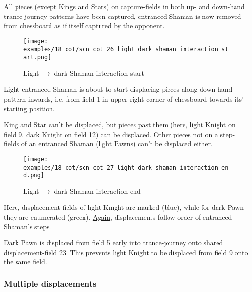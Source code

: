 All pieces (except Kings and Stars) on capture-fields in both up- and down-hand trance-journey
patterns have been captured, entranced Shaman is now removed from chessboard as if itself
captured by the opponent.

\clearpage %

\noindent
\begin{figure}[!h]
\texttt{[image: examples/18\_cot/scn\_cot\_26\_light\_dark\_shaman\_interaction\_start.png]}
\caption{Light $\rightarrow$ dark Shaman interaction start}
\label{fig:scn_cot_26_light_dark_shaman_interaction_start}
\end{figure}

Light-entranced Shaman is about to start displacing pieces along down-hand pattern inwards,
i.e. from field 1 in upper right corner of chessboard towards its' starting position.

King and Star can't be displaced, but pieces past them (here, light Knight on field 9, dark Knight
on field 12) can be displaced. Other pieces not on a step-fields of an entranced Shaman (light
Pawns) can't be displaced either.

\clearpage %

\noindent
\begin{figure}[!h]
\texttt{[image: examples/18\_cot/scn\_cot\_27\_light\_dark\_shaman\_interaction\_end.png]}
\caption{Light $\rightarrow$ dark Shaman interaction end}
\label{fig:scn_cot_27_light_dark_shaman_interaction_end}
\end{figure}

Here, displacement-fields of light Knight are marked (blue), while for dark Pawn they are
enumerated (green). \hyperref[fig:scn_cot_19_light_light_shaman_interaction_end]{Again}, displacements follow order of entranced Shaman's steps.

Dark Pawn is displaced from field 5 early into trance-journey onto shared displacement-field
23. This prevents light Knight to be displaced from field 9 onto the same field.

\clearpage %

\subsubsection*{Multiple displacements}

